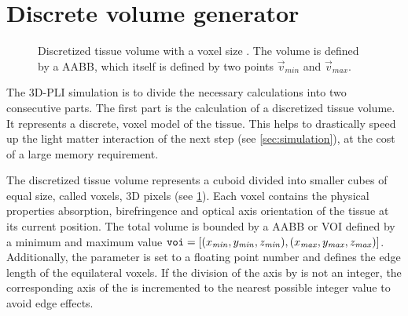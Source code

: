 \section{Discrete volume generator}
\label{sec:dv_generator}
%
\begin{figure}[!t]
\centering
\setlength{\tikzwidth}{0.5\textwidth}
\caption{Discretized tissue volume with a voxel size \voxelsize. The volume is defined by a \ac{AABB}, which itself is defined by two points $\vec{v}_\mathit{min}$ and $\vec{v}_\mathit{max}$.}
\label{fig:discVol}
\end{figure}
%
The \ac{3D-PLI} simulation is to divide the necessary calculations into two consecutive parts. The first part is the calculation of a discretized tissue volume.
It represents a discrete, voxel model of the tissue.
This helps to drastically speed up the light matter interaction of the next step (see \cref{sec:simulation}), at the cost of a large memory requirement.
\par
%
The discretized tissue volume represents a cuboid divided into smaller cubes of equal size, called voxels, \ie{} 3D pixels (see \cref{fig:discVol}).
Each voxel contains the physical properties absorption, birefringence and optical axis orientation of the tissue at its current position.
The total volume is bounded by a \ac{AABB} or \ac{VOI} defined by a minimum and maximum value $\texttt{voi} = [(x_{\mathit{min}}, y_{\mathit{min}}, z_{\mathit{min}}), (x_{\mathit{max}}, y_{\mathit{max}}, z_{\mathit{max}})]$.
Additionally, the parameter \Voxelsize{} \voxelsize{} is set to a floating point number and defines the edge length of the equilateral voxels.
If the division of the \voi{} axis by \voxelsize{} is not an integer, the corresponding axis of the \voi{} is incremented to the nearest possible integer value to avoid edge effects.
%
%
%

